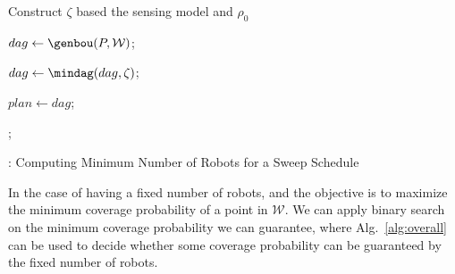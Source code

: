 \begin{algorithm}[ht]

\vspace{1mm}
Construct $\zeta$ based the sensing model and $\rho_0$\;
\vspace{1mm}

\begin{small}
\end{small}
\vspace{1mm}
$dag\leftarrow \genbou(P, {\mathcal W})$;\;

\vspace{1mm}
$dag\gets \mindag(dag, \zeta)$;\;

\vspace{1mm}
$plan\gets dag$;\;

\vspace{1mm}
\begin{small}
\end{small}

\vspace{1mm}
;\;

\caption{\protect{}: Computing Minimum Number of Robots for a Sweep Schedule}
\label{alg:overall}
\end{algorithm}



\begin{remark}
In the case of having a fixed number of robots, 
and the objective is to 
maximize the minimum coverage probability of a point in $\mathcal W$.
We can apply binary search on the minimum coverage probability we can guarantee, where Alg.~\ref{alg:overall} can be used to decide whether some coverage probability can be guaranteed by the fixed number of robots.
\end{remark}

